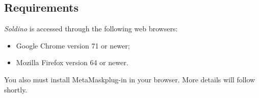 	\subsection{Requirements}
	\textit{Soldino} is accessed through the following web browsers:
	\begin{itemize}
		\item Google Chrome version 71 or newer;
		\item Mozilla Firefox version 64 or newer.
	\end{itemize}
	You also must install MetaMask\glosp plug-in in your browser. More 
	details will follow shortly. 